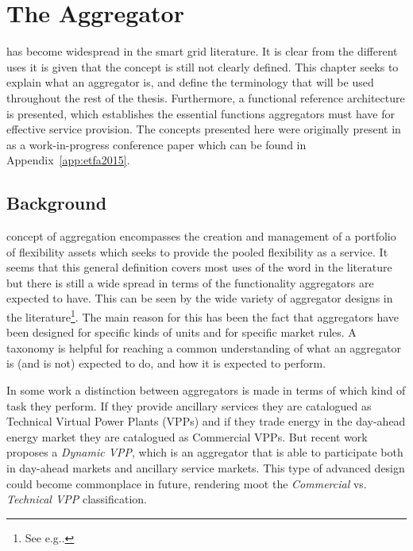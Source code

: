 \chapter{The Aggregator} %
\label{cha:aggregator}
 has become widespread in the smart grid literature. It is clear from the different uses it is given that the concept is still not clearly defined. This chapter seeks to explain what an aggregator is, and define the terminology that will be used throughout the rest of the thesis. Furthermore, a functional reference architecture is presented, which establishes the essential functions aggregators must have for effective service provision. The concepts presented here were originally present in as a work-in-progress conference paper which can be found in Appendix~\ref{app:etfa2015}. 

\section{Background}
 concept of aggregation encompasses the creation and management of a portfolio of flexibility assets which seeks to provide the pooled flexibility as a service. It seems that this general definition covers most uses of the word in the literature but there is still a wide spread in terms of the functionality aggregators are expected to have. This can be seen by the wide variety of aggregator designs in the literature\footnote{See e.g.\cite{kok2005powermatcher,han2010development,sortomme2011optimal,costanzo2013coordination}.}. The main reason for this has been the fact that aggregators have been designed for specific kinds of units and for specific market rules. A taxonomy is helpful for reaching a common understanding of what an aggregator is (and is not) expected to do, and how it is expected to perform.

In some work a distinction between aggregators is made in terms of which kind of task they perform. If they provide ancillary services they are catalogued as Technical Virtual Power Plants (VPPs) and if they trade energy in the day-ahead energy market they are catalogued as Commercial VPPs. But recent work proposes a \emph{Dynamic VPP}, which is an aggregator that is able to participate both in day-ahead markets and ancillary service markets. This type of advanced design could become commonplace in future, rendering moot the \emph{Commercial} vs. \emph{Technical VPP} classification. 


